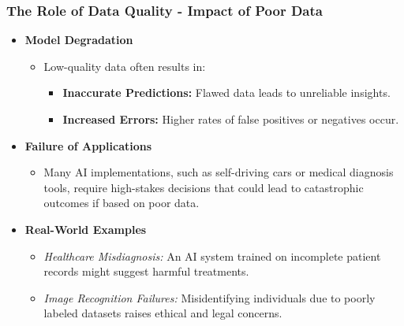\documentclass[aspectratio=169]{beamer}
\begin{document}
\begin{frame}[fragile]
    \frametitle{The Role of Data Quality - Impact of Poor Data}
    \begin{itemize}
        \item \textbf{Model Degradation}
            \begin{itemize}
                \item Low-quality data often results in:
                \begin{itemize}
                    \item \textbf{Inaccurate Predictions:} Flawed data leads to unreliable insights.
                    \item \textbf{Increased Errors:} Higher rates of false positives or negatives occur.
                \end{itemize}
            \end{itemize}

        \item \textbf{Failure of Applications}
            \begin{itemize}
                \item Many AI implementations, such as self-driving cars or medical diagnosis tools, require high-stakes decisions that could lead to catastrophic outcomes if based on poor data.
            \end{itemize}
            
        \item \textbf{Real-World Examples}
            \begin{itemize}
                \item \textit{Healthcare Misdiagnosis:} An AI system trained on incomplete patient records might suggest harmful treatments.
                \item \textit{Image Recognition Failures:} Misidentifying individuals due to poorly labeled datasets raises ethical and legal concerns.
            \end{itemize}
    \end{itemize}
\end{frame}
\end{document}
